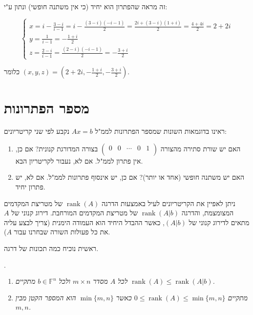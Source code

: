 \documentclass[
  hebrew,
  12pt,
  a4paper,
  oneside]{book}
\theoremstyle{definition}
\theoremstyle{remark}
\theoremstyle{plain}
\theoremstyle{remark}
\begin{document}
\begin{example}
זה מראה שהפתרון הוא יחיד (כי אין משתנה חופשי) ונתון ע"י:

\[\begin{cases}
x=i-\frac{3-i}{i-1}=i-\frac{(3-i)(-i-1)}{2}=\frac{2i+(3-i)(1+i)}{2}=\frac{4+4i}{2}=2+2i\\
y=\frac{1}{i-1}=-\frac{1+i}{2} \\
z=\frac{2-i}{i-1}=\frac{(2-i)(-i-1)}{2}=-\frac{3+i}{2}
\end{cases}\]

כלומר \((x,y,z)=(2+2i,-\frac{1+i}{2},-\frac{3+i}{2})\).

\end{example}

\section{מספר
הפתרונות}\label{ux5deux5e1ux5e4ux5e8-ux5d4ux5e4ux5eaux5e8ux5d5ux5e0ux5d5ux5ea}

ראינו בדוגמאות השונות שמספר הפתרונות לממ"ל \(Ax=b\) נקבע לפי שני
קריטריונים:

\begin{enumerate}
\def\labelenumi{\arabic{enumi}.}
\item
  האם יש שורת סתירה מהצורה \((\begin{array}{rrrr|r}
  0 & 0 & \cdots & 0 & 1 \\
  \end{array})\) בצורה המדורגת קנונית? אם כן, אין פתרון לממ"ל. אם לא,
  נעבור לקריטריון הבא.
\item
  האם יש משתנה חופשי (אחד או יותר)? אם כן, יש אינסוף פתרונות לממ"ל. אם
  לא, יש פתרון יחיד.
\end{enumerate}

ניתן לאפיין את הקריטריונים לעיל באמצעות הדרגה
\(\mathop{\mathrm{rank}}(A)\) של מטריצת המקדמים המצומצמת, והדרגה
\(\mathop{\mathrm{rank}}(A|b)\) של מטריצת המקדמים המורחבת. דירוג קנוני
של \(A\) מתאים לדירוג קנוני של \((A|b)\), כאשר ההבדל היחיד הוא העמודה
הימנית (צריך לבצע עליה את כל פעולות השורה שבחרנו עבור \(A\)).

ראשית נוכיח כמה תכונות של דרגה.

\begin{proposition}

. \emph{\label{rank-inequalities}}

\begin{enumerate}
\def\labelenumi{\arabic{enumi}.}
\item
  \emph{לכל \(A\) מסדר \(m\times n\) ולכל \(b\in\mathbb F^n\) מתקיים
  \(\mathop{\mathrm{rank}}(A)\leq\mathop{\mathrm{rank}}(A|b)\).}
\item
  \emph{מתקיים \(0\leq\mathop{\mathrm{rank}}(A)\leq\min\{m,n\}\) כאשר
  \(\min\{m,n\}\) הוא המספר הקטן מבין \(m,n\).}
\end{enumerate}

\end{proposition}
\end{document}
